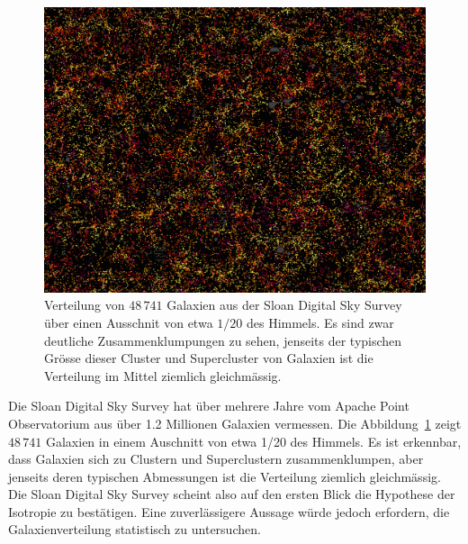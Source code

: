 \begin{figure}
\centering
\includegraphics[width=\hsize]{chapters/images/cmass.png}
\caption{Verteilung von $48\,741$ Galaxien aus der Sloan Digital
Sky Survey \cite{skript:cmass} über einen Ausschnit von etwa
$1/20$ des Himmels.
Es sind zwar deutliche Zusammenklumpungen zu sehen, jenseits der
typischen Grösse dieser Cluster und Supercluster von Galaxien
ist die Verteilung im Mittel ziemlich gleichmässig.
\label{skript:robertson:cmass}}
\end{figure}

Die Sloan Digital Sky Survey \cite{skript:sdss} hat über mehrere
Jahre vom Apache Point Observatorium aus über 1.2 Millionen Galaxien
vermessen.
Die Abbildung~\ref{skript:robertson:cmass} zeigt $48\,741$ Galaxien in
einem Auschnitt von etwa 1/20 des Himmels.
Es ist erkennbar, dass Galaxien sich zu Clustern und Superclustern
zusammenklumpen, aber jenseits deren typischen Abmessungen ist die
Verteilung ziemlich gleichmässig.
Die Sloan Digital Sky Survey scheint also auf den ersten Blick
die Hypothese der Isotropie zu bestätigen.
Eine zuverlässigere Aussage würde jedoch erfordern, die Galaxienverteilung
statistisch zu untersuchen.

